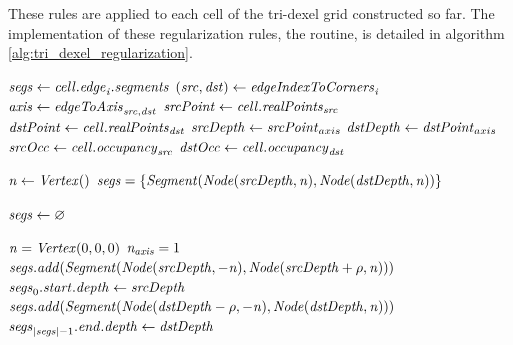 These rules are applied to each cell of the tri-dexel grid constructed so far.
The implementation of these regularization rules, \ie the  routine, is detailed in algorithm \ref{alg:tri_dexel_regularization}.
%
\begin{algorithm}
	\centering
	\begin{algorithmic}[1]
				\State $\mathit{segs} \gets \mathit{cell}.\mathit{edge}_{\mathit{i}}.\mathit{segments}$ 
				\label{alg:line:reg_vars_begin}
				\State $(\mathit{src}, \mathit{dst}) \gets \mathit{edgeIndexToCorners}_{\mathit{i}}$
				\State $\mathit{axis} \gets \mathit{edgeToAxis}_{\mathit{src}, \mathit{dst}}$
				\State $\mathit{srcPoint} \gets \mathit{cell}.\mathit{realPoints}_{\mathit{src}}$
				\State $\mathit{dstPoint} \gets \mathit{cell}.\mathit{realPoints}_{\mathit{dst}}$
				\State $\mathit{srcDepth} \gets \mathit{srcPoint}_{axis}$
				\State $\mathit{dstDepth} \gets \mathit{dstPoint}_{axis}$
				\State $\mathit{srcOcc} \gets \mathit{cell}.\mathit{occupancy}_{\mathit{src}}$
				\State $\mathit{dstOcc} \gets \mathit{cell}.\mathit{occupancy}_{\mathit{dst}}$
				\label{alg:line:reg_vars_end}

					\State $\mathit{n} \gets \mathit{Vertex}()$ 
					\State $\mathit{segs} = \{ \mathit{Segment}(\mathit{Node}(\mathit{srcDepth}, \mathit{n}), \mathit{Node}(\mathit{dstDepth}, \mathit{n})) \}$
				\EndIf

					\State $\mathit{segs} \gets \varnothing$
				\EndIf

				\State $\mathit{n} = \mathit{Vertex}(0, 0, 0)$
				\State $\mathit{n}_{\mathit{axis}} = 1$
						\State $\mathit{segs}.\mathit{add}(\mathit{Segment}(\mathit{Node}(\mathit{srcDepth}, -\mathit{n}), \mathit{Node}(\mathit{srcDepth} + \rho, \mathit{n})))$ %
						\State $\mathit{segs}_0.\mathit{start}.\mathit{depth} \gets \mathit{srcDepth}$
					\EndIf
				\EndIf
						\State $\mathit{segs}.\mathit{add}(\mathit{Segment}(\mathit{Node}(\mathit{dstDepth} - \rho, -\mathit{n}), \mathit{Node}(\mathit{dstDepth}, \mathit{n})))$
						\State $\mathit{segs}_{|\mathit{segs}| - 1}.\mathit{end}.\mathit{depth} \gets \mathit{dstDepth}$
					\EndIf
				\EndIf


\end{algorithmic}
\end{algorithm}
